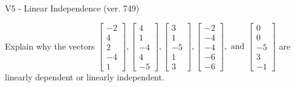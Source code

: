 \begin{exercise}
  \begin{exerciseTitle}V5 - Linear Independence (ver. 749)\end{exerciseTitle}
  \begin{exerciseStatement}
    Explain why the vectors \(\left[\begin{array}{r}
-2 \\
4 \\
2 \\
-4 \\
1
\end{array}\right] , \left[\begin{array}{r}
4 \\
1 \\
-4 \\
4 \\
-5
\end{array}\right] , \left[\begin{array}{r}
3 \\
1 \\
-5 \\
1 \\
3
\end{array}\right] , \left[\begin{array}{r}
-2 \\
-4 \\
-4 \\
-6 \\
-6
\end{array}\right] , \text{ and } \left[\begin{array}{r}
0 \\
0 \\
-5 \\
3 \\
-1
\end{array}\right]\) are linearly dependent or linearly independent.	



\end{exerciseStatement}
\end{exercise}
